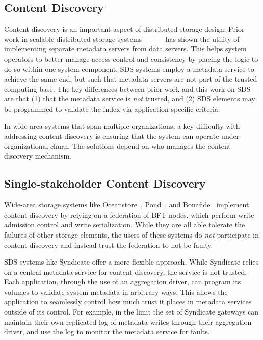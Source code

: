 \subsection{Content Discovery}

Content discovery is an important aspect of distributed storage design.
Prior work in scalable distributed storage systems~\cite{berkeley-xFS}~\cite{farsight}~\cite{zebra}~\cite{spritefs}~\cite{glusterfs}~\cite{lustre}
has shown the utility of implementing separate metadata servers from data
servers.  This helps system operators to better manage access control and
consistency by placing the logic to do so within one system component.
SDS systems employ a metadata service to achieve the same end, but
such that metadata servers are not part of the trusted computing base.
The key differences between prior work and this work on SDS are that (1) that the metadata
service is \emph{not} trusted, and (2) SDS elements may be programmed to
validate the index via application-specific criteria.

In wide-area systems that span multiple organizations, a key difficulty with
addressing content discovery is ensuring that the system can operate under
organizational churn.  The solutions depend on who manages the content discovery
mechanism.

\subsection{Single-stakeholder Content Discovery}

Wide-area storage systems like Oceanstore~\cite{oceanstore}, Pond~\cite{pond},
and Bonafide~\cite{bonafide} implement content discovery by relying on a
federation of BFT nodes, which perform write admission control and write
serialization.  While they are all able tolerate the failures of other storage
elements, the users of these systems do \emph{not} participate in content
discovery and instead trust the federation to not be faulty.

SDS systems like Syndicate offer a more flexible approach.  While Syndicate
relies on a central metadata service for content discovery, the service is not
trusted.  Each application, through the use of an aggregation driver, can
program its volumes to validate system metadata in arbitrary ways.  This allows
the application to seamlessly control how much trust it places in metadata
services outside of its control.  For example, in the limit
the set of Syndicate gateways can maintain their own replicated log of metadata
writes through their aggregation driver,
and use the log to monitor the metadata service for faults.

